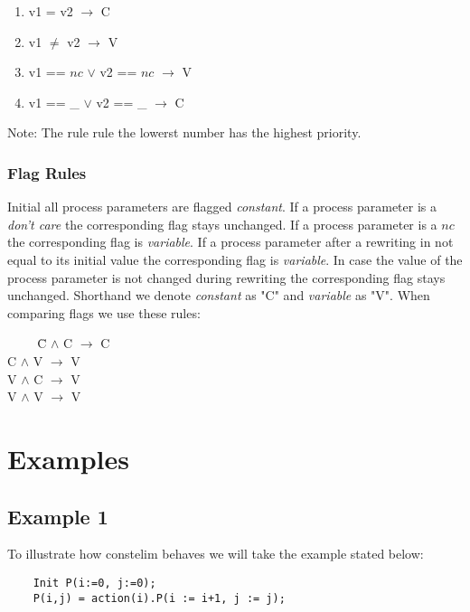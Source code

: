 \documentclass[a4paper,9pt]{article}
\begin{document}
\begin{enumerate}
\item  v1 = v2 $\rightarrow$ C 
\item v1 $\neq$ v2 $\rightarrow$ V 
\item v1 == $nc$ $\vee$ v2 == $nc$ $\rightarrow$ V
\item v1 == \_ $\vee$ v2 == \_ $\rightarrow$ C 
\end{enumerate}
Note: The rule rule the lowerst number has the highest priority.

\subsubsection*{Flag Rules} 
Initial all process parameters are flagged \textit{constant}.
If a process parameter is a \textit{don't care} the corresponding flag stays unchanged.
If a process parameter is a $nc$ the corresponding flag is \textit{variable}.
If a process parameter after a rewriting in not equal to its initial value the corresponding flag is \textit{variable}.
In case the value of the process parameter is not changed during rewriting the corresponding flag stays unchanged.
Shorthand we denote \textit{constant} as "C" and \textit{variable} as "V". When comparing flags we use these rules: 
\begin{tabbing}
\verb"    " \= C $\wedge$ C $\rightarrow$ C \\
\> C $\wedge$ V $\rightarrow$ V \\
\> V $\wedge$ C $\rightarrow$ V \\
\> V $\wedge$ V $\rightarrow$ V \\
\end{tabbing}
\section{Examples}
\subsection{Example 1}
To illustrate how constelim behaves we will take the example stated below:
\begin{verbatim}
    Init P(i:=0, j:=0);
    P(i,j) = action(i).P(i := i+1, j := j); 
\end{verbatim}
\end{document}
